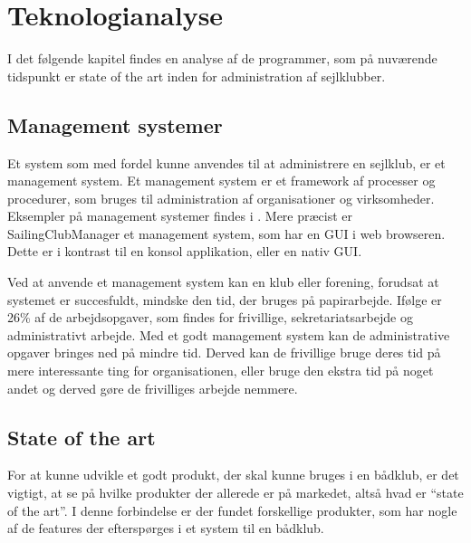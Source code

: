 \chapter{Teknologianalyse}\label{chap:teknologi-analyse}

I det følgende kapitel findes en analyse af de programmer, som på nuværende tidspunkt er state of the art inden for administration af sejlklubber.


\section{Management systemer}\label{subsec:management-systemer}

Et system som med fordel kunne anvendes til at administrere en sejlklub, er et management system.
Et management system er et framework af processer og procedurer, som bruges til administration af organisationer og virksomheder.
Eksempler på management systemer findes i . 
Mere præcist er SailingClubManager et management system, som har en \ac{GUI} i web browseren.
Dette er i kontrast til en konsol applikation, eller en nativ \ac{GUI}.

Ved at anvende et management system kan en klub eller forening, forudsat at systemet er succesfuldt, mindske den tid, der bruges på papirarbejde. 
Ifølge \citet{Frivilligrapporten} er 26\% af de arbejdsopgaver, som findes for frivillige, sekretariatsarbejde og administrativt arbejde. 
Med et godt management system kan de administrative opgaver bringes ned på mindre tid. 
Derved kan de frivillige bruge deres tid på mere interessante ting for organisationen, eller bruge den ekstra tid på noget andet og derved gøre de frivilliges arbejde nemmere.


\section{State of the art}\label{sec:sota}

For at kunne udvikle et godt produkt, der skal kunne bruges i en bådklub, er det vigtigt, at se på hvilke produkter der allerede er på markedet, altså hvad er ``state of the art''. 
I denne forbindelse er der fundet forskellige produkter, som har nogle af de features der efterspørges i et system til en bådklub.



